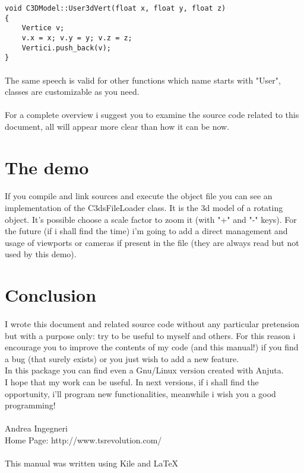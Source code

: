 \documentclass[11pt,a4paper]{article}
\begin{document}
\begin{verbatim}
void C3DModel::User3dVert(float x, float y, float z)
{
	Vertice v;
	v.x = x; v.y = y; v.z = z;
	Vertici.push_back(v);
}
\end{verbatim}

\paragraph*{}
The same speech is valid for other functions which name starts with "User", classes are customizable as you need.

\paragraph*{}
For a complete overview i suggest you to examine the source code related to this document, all will appear more clear than how it can be now.

\section*{The demo}

\paragraph*{}
If you compile and link sources and execute the object file you can see an implementation of the C3dsFileLoader class. It is the 3d model of a rotating object. It's possible choose a scale factor to zoom it (with "+" and "-" keys). For the future (if i shall find the time) i'm going to add a direct management and usage of viewports or cameras if present in the file (they are always read but not used by this demo).

\section*{Conclusion}

\paragraph*{}
I wrote this document and related source code without any particular pretension but with a purpose only: try to be useful to myself and others. For this reason i encourage you to improve the contents of my code (and this manual!) if you find a bug (that surely exists) or you just wish to add a new feature.\\
In this package you can find even a Gnu/Linux version created with Anjuta.\\
I hope that my work can be useful. In next versions, if i shall find the opportunity, i'll program new functionalities, meanwhile i wish you a good programming!\\
\\
Andrea Ingegneri\\
Home Page: http://www.tsrevolution.com/
\\ \\
This manual was written using Kile and \LaTeX
\end{document}
